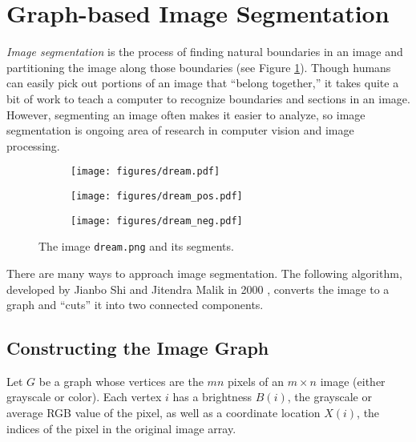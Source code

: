 \section*{Graph-based Image Segmentation} %

\emph{Image segmentation} is the process of finding natural boundaries in an image and partitioning the image along those boundaries (see Figure \ref{fig:imgseg-segmentation-example}).
Though humans can easily pick out portions of an image that ``belong together,'' it takes quite a bit of work to teach a computer to recognize boundaries and sections in an image.
However, segmenting an image often makes it easier to analyze, so image segmentation is ongoing area of research in computer vision and image processing.

\begin{figure}[H] %
    \centering
    \begin{subfigure}{.32\textwidth}
        \texttt{[image: figures/dream.pdf]}
    \end{subfigure}
    \begin{subfigure}{.32\textwidth}
        \texttt{[image: figures/dream\_pos.pdf]}
    \end{subfigure}
    \begin{subfigure}{.32\textwidth}
        \texttt{[image: figures/dream\_neg.pdf]}
    \end{subfigure}
\caption{The image \texttt{dream.png} and its segments.}
\label{fig:imgseg-segmentation-example}
\end{figure}

There are many ways to approach image segmentation.
The following algorithm, developed by Jianbo Shi and Jitendra Malik in 2000 \cite{Shi2000}, converts the image to a graph and ``cuts'' it into two connected components.

\subsection*{Constructing the Image Graph} %

Let $G$ be a graph whose vertices are the $mn$ pixels of an $m\times n$ image (either grayscale or color).
Each vertex $i$ has a brightness $B(i)$, the grayscale or average RGB value of the pixel, as well as a coordinate location $X(i)$, the indices of the pixel in the original image array.

